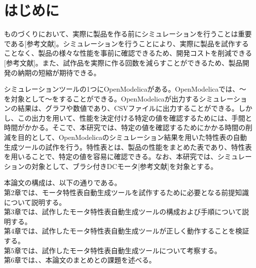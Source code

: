 \chapter{はじめに}\label{cha:Introduction}
ものづくりにおいて、実際に製品を作る前にシミュレーションを行うことは重要である[参考文献]。シミュレーションを行うことにより、実際に製品を試作することなく、製品の様々な性能を事前に確認できるため、開発コストを削減できる[参考文献]。また、試作品を実際に作る回数を減らすことができるため、製品開発の納期の短縮が期待できる。

シミュレーションツールの1つにOpenModelicaがある。OpenModelicaでは、～を対象として～をすることができる。OpenModelicaが出力するシミュレーションの結果は、グラフや数値であり、CSVファイルに出力することができる。しかし、この出力を用いて、性能を決定付ける特定の値を確認するためには、手間と時間がかかる。そこで、本研究では、特定の値を確認するためにかかる時間の削減を目的として、OpenModelicaのシミュレーション結果を用いた特性表の自動生成ツールの試作を行う。特性表とは、製品の性能をまとめた表であり、特性表を用いることで、特定の値を容易に確認できる。なお、本研究では、シミュレーションの対象として、ブラシ付きDCモータ[参考文献]を対象とする。



本論文の構成は、以下の通りである。\\
第2章では、モータ特性表自動生成ツールを試作するために必要となる前提知識について説明する。\\
第3章では、試作したモータ特性表自動生成ツールの構成および手順について説明する。\\
第4章では、試作したモータ特性表自動生成ツールが正しく動作することを検証する。\\
第5章では、試作したモータ特性表自動生成ツールについて考察する。\\
第6章では、、本論文のまとめとの課題を述べる。\\